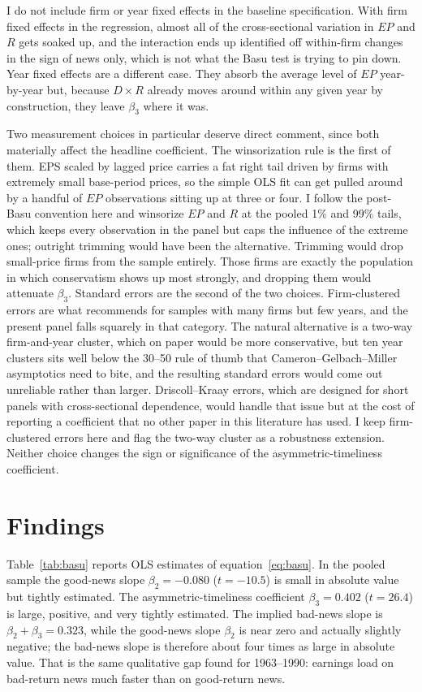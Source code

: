 \documentclass[12pt]{article}
\begin{document}
I do not include firm or year fixed effects in the baseline specification. With firm fixed effects in the regression, almost all of the cross-sectional variation in $EP$ and $R$ gets soaked up, and the interaction ends up identified off within-firm changes in the sign of news only, which is not what the Basu test is trying to pin down. Year fixed effects are a different case. They absorb the average level of $EP$ year-by-year but, because $D \times R$ already moves around within any given year by construction, they leave $\beta_3$ where it was.

Two measurement choices in particular deserve direct comment, since both materially affect the headline coefficient. The winsorization rule is the first of them. EPS scaled by lagged price carries a fat right tail driven by firms with extremely small base-period prices, so the simple OLS fit can get pulled around by a handful of $EP$ observations sitting up at three or four. I follow the post-Basu convention here and winsorize $EP$ and $R$ at the pooled 1\% and 99\% tails, which keeps every observation in the panel but caps the influence of the extreme ones; outright trimming would have been the alternative. Trimming would drop small-price firms from the sample entirely. Those firms are exactly the population in which conservatism shows up most strongly, and dropping them would attenuate $\beta_3$. Standard errors are the second of the two choices. Firm-clustered errors are what \citet{petersen2009} recommends for samples with many firms but few years, and the present panel falls squarely in that category. The natural alternative is a two-way firm-and-year cluster, which on paper would be more conservative, but ten year clusters sits well below the 30--50 rule of thumb that Cameron--Gelbach--Miller asymptotics need to bite, and the resulting standard errors would come out unreliable rather than larger. Driscoll--Kraay errors, which are designed for short panels with cross-sectional dependence, would handle that issue but at the cost of reporting a coefficient that no other paper in this literature has used. I keep firm-clustered errors here and flag the two-way cluster as a robustness extension. Neither choice changes the sign or significance of the asymmetric-timeliness coefficient.

\section{Findings}
\label{sec:findings}
Table~\ref{tab:basu} reports OLS estimates of equation~\eqref{eq:basu}. In the pooled sample the good-news slope $\beta_{2} = -0.080$ ($t=-10.5$) is small in absolute value but tightly estimated. The asymmetric-timeliness coefficient $\beta_{3} = 0.402$ ($t=26.4$) is large, positive, and very tightly estimated. The implied bad-news slope is $\beta_{2} + \beta_{3} = 0.323$, while the good-news slope $\beta_{2}$ is near zero and actually slightly negative; the bad-news slope is therefore about four times as large in absolute value. That is the same qualitative gap \citet{basu1997} found for 1963--1990: earnings load on bad-return news much faster than on good-return news.
\end{document}
